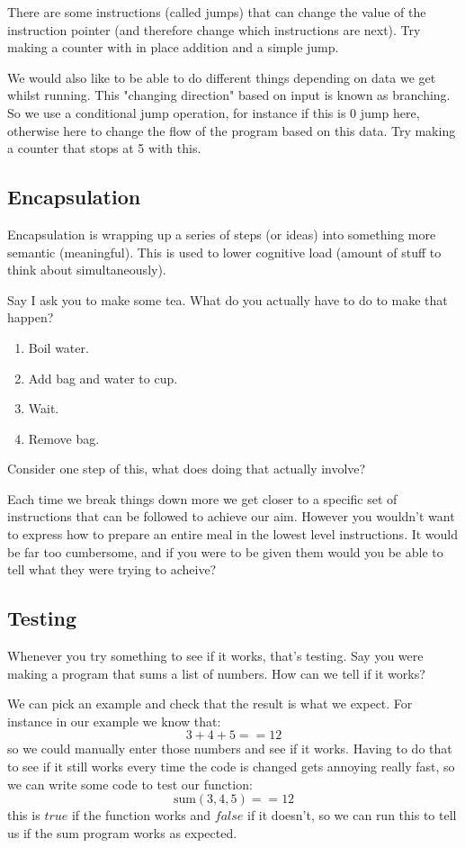 \documentclass{article}
\begin{document}
There are some instructions (called jumps) that can change the value of the
instruction pointer (and therefore change which instructions are next).
Try making a counter with in place addition and a simple jump.

We would also like to be able to do different things depending on data we get
whilst running. This "changing direction" based on input is known as branching.
So we use a conditional jump operation, for instance if this is 0 jump here,
otherwise here to change the flow of the program based on this data.
Try making a counter that stops at 5 with this.

\subsection{Encapsulation}
Encapsulation is wrapping up a series of steps (or ideas) into something more
semantic (meaningful). This is used to lower cognitive load (amount of stuff to
think about simultaneously).

Say I ask you to make some tea.
What do you actually have to do to make that happen?
\begin{enumerate}
\item Boil water.
\item Add bag and water to cup.
\item Wait.
\item Remove bag.
\end{enumerate}
Consider one step of this, what does doing that actually involve?

Each time we break things down more we get closer to a specific set of
instructions that can be followed to achieve our aim. However you wouldn't want
to express how to prepare an entire meal in the lowest level instructions. It
would be far too cumbersome, and if you were to be given them would you be able
to tell what they were trying to acheive?

\subsection{Testing}
Whenever you try something to see if it works, that's testing.
Say you were making a program that sums a list of numbers.
How can we tell if it works?

We can pick an example and check that the result is what we expect.
For instance in our example we know that:
\begin{displaymath}
3 + 4 + 5 == 12
\end{displaymath}
so we could manually enter those numbers and see if it works. Having to do that
to see if it still works every time the code is changed gets annoying really
fast, so we can write some code to test our function:
\begin{displaymath}
\mathrm{sum}(3, 4, 5) ==  12
\end{displaymath}
this is $true$ if the function works and $false$ if it doesn't, so we can run
this to tell us if the sum program works as expected.
\end{document}
